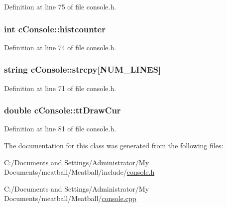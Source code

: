 Definition at line 75 of file console.\-h.

\hypertarget{classc_console_a77c94fd7d7fbf2eaa51fe1c6c31d5d20}{
\subsubsection[{histcounter}]{\setlength{\rightskip}{0pt plus 5cm}int c\-Console\-::histcounter}}\label{classc_console_a77c94fd7d7fbf2eaa51fe1c6c31d5d20}


Definition at line 74 of file console.\-h.

\hypertarget{classc_console_a2917d66112148351d54cc8f80e1eae71}{
\subsubsection[{strcpy}]{\setlength{\rightskip}{0pt plus 5cm}string c\-Console\-::strcpy\mbox{[}{\bf N\-U\-M\-\_\-\-L\-I\-N\-E\-S}\mbox{]}}}\label{classc_console_a2917d66112148351d54cc8f80e1eae71}


Definition at line 71 of file console.\-h.

\hypertarget{classc_console_a0e75ec4d7712eefa3571bc09ced1ac32}{
\subsubsection[{tt\-Draw\-Cur}]{\setlength{\rightskip}{0pt plus 5cm}double c\-Console\-::tt\-Draw\-Cur}}\label{classc_console_a0e75ec4d7712eefa3571bc09ced1ac32}


Definition at line 81 of file console.\-h.



The documentation for this class was generated from the following files\-:\begin{DoxyCompactItemize}
\item 
C\-:/\-Documents and Settings/\-Administrator/\-My Documents/meatball/\-Meatball/include/\hyperlink{console_8h}{console.\-h}\item 
C\-:/\-Documents and Settings/\-Administrator/\-My Documents/meatball/\-Meatball/\hyperlink{console_8cpp}{console.\-cpp}\end{DoxyCompactItemize}
